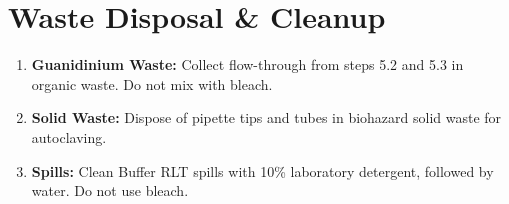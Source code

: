 \section{Waste Disposal \& Cleanup}
\begin{enumerate}
  \item \textbf{Guanidinium Waste:} Collect flow-through from steps 5.2 and 5.3 in organic waste. Do not mix with bleach.
  \item \textbf{Solid Waste:} Dispose of pipette tips and tubes in biohazard solid waste for autoclaving.
  \item \textbf{Spills:} Clean Buffer RLT spills with 10\% laboratory detergent, followed by water. Do not use bleach.
\end{enumerate}
